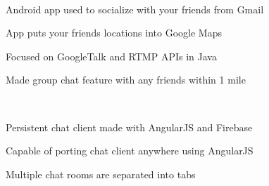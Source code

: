 \documentclass[]{deedy-resume-openfont}
\begin{document}
\begin{minipage}[t]{0.66\textwidth}
 \\
\begin{tightemize}
\item Android app used to socialize with your friends from Gmail
\item App puts your friends locations into Google Maps
\item Focused on GoogleTalk and RTMP APIs in Java
\item Made group chat feature with any friends within 1 mile
\end{tightemize}
\sectionsep

\href{https://playwithfire.firebaseapp.com/}{} \\
\begin{tightemize}
\item Persistent chat client made with AngularJS and Firebase
\item Capable of porting chat client anywhere using AngularJS
\item Multiple chat rooms are separated into tabs 
\end{tightemize}
\sectionsep

\end{minipage} 
\end{document}
